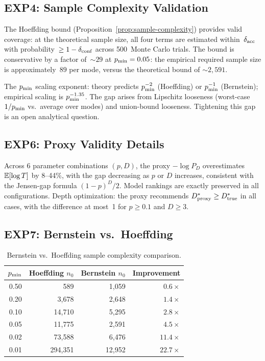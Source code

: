 \subsection{EXP4: Sample Complexity Validation}

The Hoeffding bound (Proposition~\ref{prop:sample-complexity}) provides valid coverage: at the theoretical sample size, all four terms are estimated within~$\delta_{\mathrm{acc}}$ with probability~$\ge 1 - \delta_{\mathrm{conf}}$ across 500~Monte Carlo trials.
The bound is conservative by a factor of~$\sim 29$ at $p_{\min} = 0.05$: the empirical required sample size is approximately~$89$ per mode, versus the theoretical bound of $\sim 2{,}591$.

The $p_{\min}$ scaling exponent: theory predicts $p_{\min}^{-2}$ (Hoeffding) or $p_{\min}^{-1}$ (Bernstein); empirical scaling is $p_{\min}^{-1.35}$.
The gap arises from Lipschitz looseness (worst-case $1/p_{\min}$ vs.\ average over modes) and union-bound looseness.
Tightening this gap is an open analytical question.

\subsection{EXP6: Proxy Validity Details}

Across 6 parameter combinations $(p, D)$, the proxy $-\log P_D$ overestimates $\mathbb{E}[\log T]$ by 8--44\%, with the gap decreasing as $p$ or $D$ increases, consistent with the Jensen-gap formula $(1-p)^D/2$.
Model rankings are exactly preserved in all configurations.
Depth optimization: the proxy recommends $D^*_{\mathrm{proxy}} \ge D^*_{\mathrm{true}}$ in all cases, with the difference at most~1 for $p \ge 0.1$ and $D \ge 3$.

\subsection{EXP7: Bernstein vs.\ Hoeffding}

\begin{table}[h]
\centering
\caption{Bernstein vs.\ Hoeffding sample complexity comparison.}
\label{tab:bernstein}
\begin{tabular}{rrrr}
\toprule
$p_{\min}$ & Hoeffding $n_0$ & Bernstein $n_0$ & Improvement \\
\midrule
0.50 & 589 & 1{,}059 & $0.6\times$ \\
0.20 & 3{,}678 & 2{,}648 & $1.4\times$ \\
0.10 & 14{,}710 & 5{,}295 & $2.8\times$ \\
0.05 & 11{,}775 & 2{,}591 & $4.5\times$ \\
0.02 & 73{,}588 & 6{,}476 & $11.4\times$ \\
0.01 & 294{,}351 & 12{,}952 & $22.7\times$ \\
\bottomrule
\end{tabular}
\end{table}

